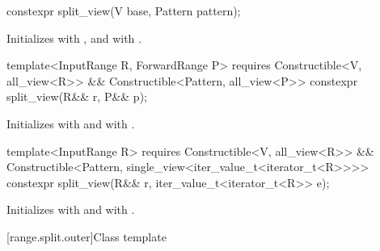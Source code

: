 %
\begin{itemdecl}
constexpr split_view(V base, Pattern pattern);
\end{itemdecl}

\begin{itemdescr}
\pnum
\effects Initializes  with , and
 with .
\end{itemdescr}

%
\begin{itemdecl}
template<InputRange R, ForwardRange P>
  requires Constructible<V, all_view<R>> &&
           Constructible<Pattern, all_view<P>>
constexpr split_view(R&& r, P&& p);
\end{itemdecl}

\begin{itemdescr}
\pnum
\effects
Initializes  with  and
 with .
\end{itemdescr}

%
\begin{itemdecl}
template<InputRange R>
  requires Constructible<V, all_view<R>> &&
           Constructible<Pattern, single_view<iter_value_t<iterator_t<R>>>>
constexpr split_view(R&& r, iter_value_t<iterator_t<R>> e);
\end{itemdecl}

\begin{itemdescr}
\pnum
\effects
Initializes  with  and
 with .
\end{itemdescr}

[range.split.outer]{Class template }

